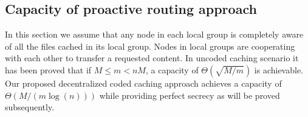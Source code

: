 \documentclass[10pt,journal]{IEEEtran}
\newtheorem{corol}{Corollary}
\begin{document}
% 
\subsection{Capacity of proactive routing approach}

In this section we assume that any node in each local group is completely aware of all the files cached in its local group. Nodes in local groups are cooperating with each other to transfer a requested content. 
In uncoded caching scenario it has been proved \cite{DBLP:conf/icc/JeonHJC15} that if $M \le m < nM$, a capacity of $\Theta \left( \sqrt{{M}/{m}} \right)$ is achievable. Our proposed decentralized coded caching approach achieves a capacity of $\Theta \left( {{M}/{(m\log(n))}} \right)$ while providing perfect secrecy as will be proved subsequently. 
\end{document}
